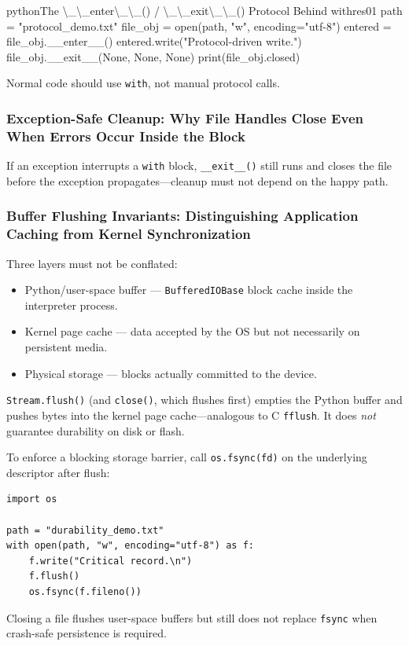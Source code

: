 \begin{codebox}[]{python}{The \textbackslash{}\_\textbackslash{}\_enter\textbackslash{}\_\textbackslash{}\_() / \textbackslash{}\_\textbackslash{}\_exit\textbackslash{}\_\textbackslash{}\_() Protocol Behind with}{res01}
path = "protocol_demo.txt"
file_obj = open(path, "w", encoding="utf-8")
entered = file_obj.__enter__()
entered.write("Protocol-driven write.\n")
file_obj.__exit__(None, None, None)
print(file_obj.closed)
\end{codebox}


Normal code should use \texttt{with}, not manual protocol calls.

\subsubsection{Exception-Safe Cleanup: Why File Handles Close Even When Errors Occur Inside the Block}

If an exception interrupts a \texttt{with} block, \texttt{\_\_exit\_\_()} still runs and closes the file before the exception propagates---cleanup must not depend on the happy path.

\subsubsection{Buffer Flushing Invariants: Distinguishing Application Caching from Kernel Synchronization}

Three layers must not be conflated:

\begin{itemize}
    \item Python/user-space buffer --- \texttt{BufferedIOBase} block cache inside the interpreter process.
    \item Kernel page cache --- data accepted by the OS but not necessarily on persistent media.
    \item Physical storage --- blocks actually committed to the device.
\end{itemize}

\texttt{Stream.flush()} (and \texttt{close()}, which flushes first) empties the Python buffer and pushes bytes into the kernel page cache---analogous to C \texttt{fflush}. It does \emph{not} guarantee durability on disk or flash.

To enforce a blocking storage barrier, call \texttt{os.fsync(fd)} on the underlying descriptor after flush:

\begin{verbatim}
import os

path = "durability_demo.txt"
with open(path, "w", encoding="utf-8") as f:
    f.write("Critical record.\n")
    f.flush()
    os.fsync(f.fileno())
\end{verbatim}

Closing a file flushes user-space buffers but still does not replace \texttt{fsync} when crash-safe persistence is required.
